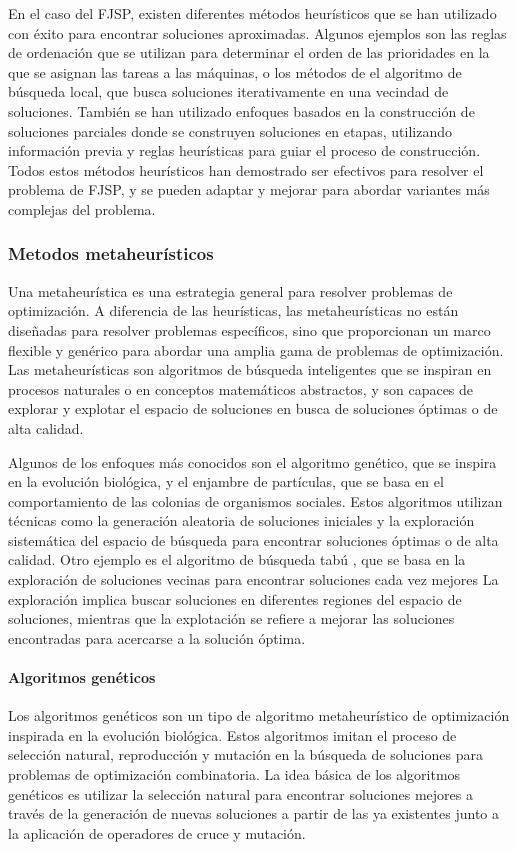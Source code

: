 En el caso del FJSP, existen diferentes métodos heurísticos que se han
utilizado con éxito para encontrar soluciones aproximadas. Algunos ejemplos son
las reglas de ordenación que se utilizan para determinar el orden de las
prioridades en la que se asignan las tareas a las máquinas, o los métodos de
el algoritmo de búsqueda local, que busca soluciones iterativamente en una
vecindad de soluciones. También se han utilizado enfoques basados en la
construcción de soluciones parciales donde se construyen soluciones en etapas,
utilizando información previa y reglas heurísticas para guiar el proceso de
construcción. Todos estos métodos heurísticos han demostrado ser efectivos para
resolver el problema de FJSP, y se pueden adaptar y mejorar para abordar
variantes más complejas del problema.

\subsubsection{Metodos metaheurísticos}
Una metaheurística \cite{Metaheuristic_2023} es una estrategia general para
resolver problemas de optimización. A diferencia de las heurísticas, las
metaheurísticas no están diseñadas para resolver problemas específicos, sino
que proporcionan un marco flexible y genérico para abordar una amplia gama de
problemas de optimización. Las metaheurísticas son algoritmos de búsqueda
inteligentes que se inspiran en procesos naturales o en conceptos matemáticos
abstractos, y son capaces de explorar y explotar el espacio de soluciones en
busca de soluciones óptimas o de alta calidad.\medskip

Algunos de los enfoques más conocidos son el algoritmo genético, que se inspira
en la evolución biológica, y el enjambre de partículas, que se basa en el
comportamiento de las colonias de organismos sociales. Estos algoritmos
utilizan técnicas como la generación aleatoria de soluciones iniciales y la
exploración sistemática del espacio de búsqueda para encontrar soluciones
óptimas o de alta calidad. Otro ejemplo es el algoritmo de búsqueda tabú 
\cite{Howell_2023}, que se basa en la exploración de soluciones vecinas para 
encontrar soluciones cada vez mejores La exploración implica buscar soluciones en
diferentes regiones del espacio de soluciones, mientras que la explotación se
refiere a mejorar las soluciones encontradas para acercarse a la solución
óptima.

\paragraph{Algoritmos genéticos}
Los algoritmos genéticos \cite{GeneticAlgorithm_2023} son un tipo de 
algoritmo metaheurístico de optimización inspirada en la evolución biológica. 
Estos algoritmos imitan el proceso de selección natural, reproducción y mutación en la búsqueda de
soluciones para problemas de optimización combinatoria. La idea básica de los
algoritmos genéticos es utilizar la selección natural para encontrar soluciones
mejores a través de la generación de nuevas soluciones a partir de las ya
existentes junto a la aplicación de operadores de cruce y mutación.\medskip

